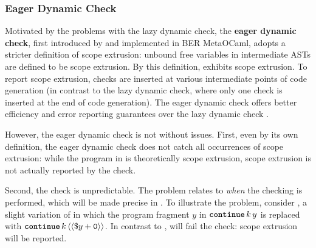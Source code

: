 \subsubsection{Eager Dynamic Check}\label{subsubsection:eager-dynamic-check}
Motivated by the problems with the lazy dynamic check, the \textbf{eager dynamic check}, first introduced by \citet{kiselyov-14} and implemented in BER MetaOCaml, adopts a stricter definition of scope extrusion: unbound free variables in intermediate ASTs are defined to be scope extrusion. By this definition,  exhibits scope extrusion. To report scope extrusion, checks are inserted at various intermediate points of code generation (in contrast to the lazy dynamic check, where only one check is inserted at the end of code generation). The eager dynamic check offers better efficiency and error reporting guarantees over the lazy dynamic check \citep{kiselyov-14}.

However, the eager dynamic check is not without issues. First, even by its own definition, the eager dynamic check does not catch all occurrences of scope extrusion: while the program in  is theoretically scope extrusion, scope extrusion is not actually reported by the check. 

Second, the check is unpredictable. The problem relates to \textit{when} the checking is performed, which will be made precise in . To illustrate the problem, consider , a slight variation of  in which the program fragment $y$ in $\continue{k}{y}$ is replaced with $\continue{k}{\equote[{\splice[y] + \texttt{0}}]}$. In contrast to ,  will fail the check: scope extrusion will be reported. 

